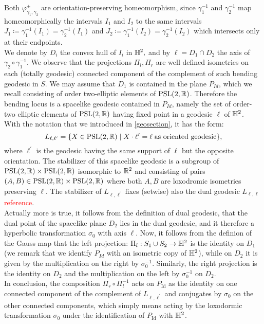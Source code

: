     Both $\varphi_{\gamma_1,\gamma_2}^{\pm}$ are orientation-preserving homeomorphism, since $\gamma_1^{-1}$ and $\gamma_2^{-1}$ map homeomorphically the intervals $I_1$ and $I_2$ to the same intervals $J_1\coloneqq\gamma_1^{-1}(I_1)=\gamma_2^{-1}(I_1)$ and $J_2\coloneqq\gamma_1^{-1}(I_2)=\gamma_2^{-1}(I_2)$ which intersects only at their endpoints. \\
    We denote by $D_i$ the convex hull of $I_i$ in $\mathbb{H}^2,$ and by $\ell=D_1\cap D_2$ the axis of $\gamma_2\circ\gamma_1^{-1}$. 
    We observe that the projections $\Pi_l, \Pi_r$ are well defined isometries on each (totally geodesic) connected component of the complement of such bending geodesic in $S$. We may assume that $D_1$ is contained in the plane $P_{Id}$, which we recall consisting of order two-elliptic elements of $\text{PSL}(2,\mathbb{R})$. Therefore the bending locus is a spacelike geodesic contained in $P_{Id}$, namely the set of order-two elliptic elements of $\text{PSL}(2,\mathbb{R})$ having fixed point in a geodesic $\ell$ of $\mathbb{H}^2$. \\ 
    With the notation that we introduced in \ref{geosection}, it has the form: 
    \[
        L_{\ell,\ell^{\prime}}=\{X\in\text{PSL}(2,\mathbb{R})\;|\;X\cdot\ell^{\prime} =\ell\; \text{as oriented geodesic}\}, 
    \]
    where $\ell^{\prime}$ is the geodesic having the same support of $\ell$ but the opposite orientation. The stabilizer of this spacelike geodesic is a subgroup of $\text{PSL}(2,\mathbb{R})\times\text{PSL}(2,\mathbb{R})$ isomorphic to $\mathbb{R}^2$ and consisting of pairs $(A,B)\in\text{PSL}(2,\mathbb{R})\times\text{PSL}(2,\mathbb{R})$ where both $A,B$ are loxodromic isometries preserving $\ell$. The stabilizer of $L_{\ell,\ell^{\prime}}$ fixes (setwise) also the dual geodesic $L_{\ell,\ell}$ \textcolor{red}{reference}. \\
    Actually more is true, it follows from the definition of dual geodesic, that the dual point of the spacelike plane $D_2$ lies in the dual geodesic, and it therefore a hyperbolic transformation $\sigma_0$ with axis $\ell$. Now, it follows from the definion of the Gauss map that the left projection: \(\Pi_l:S_1\cup S_2\to\mathbb{H}^2\) is the identity on $D_1$ (we remark that we identify $P_{Id}$ with an isometric copy of $\mathbb{H}^2$), while on $D_2$ it is given by the multiplication on the right by $\sigma_0^{-1}$. Similarly, the right projection is the identity on $D_2$ and the multiplication on the left by $\sigma_0^{-1}$ on $D_2$.\\
    In conclusion, the composition $\Pi_r\circ\Pi_l^{-1}$ acts on $P_{\text{Id}}$ as the identity on one connected component of the complement of $L_{\ell,\ell^{\prime}}$ and conjugates by $\sigma_0$ on the other connected components, which simply means acting by the loxodormic transformation $\sigma_0$ under the identification of $P_{\text{Id}}$ with $\mathbb{H}^2$.\\
